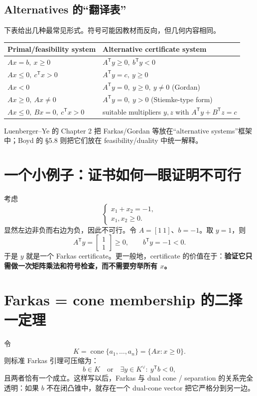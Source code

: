 \documentclass[11pt,a4paper,openany]{ctexrep}
\theoremstyle{definition}
\newcommand{\cone}{\operatorname{cone}}
\newcommand{\transpose}{\mathsf{T}}
\begin{document}
\subsection{Alternatives 的“翻译表”}
下表给出几种最常见形式。符号可能因教材而反向，但几何内容相同。
\begin{center}
\small
\begin{tabularx}{\textwidth}{>{\raggedright\arraybackslash}X >{\raggedright\arraybackslash}X}
\toprule
\textbf{Primal/feasibility system} & \textbf{Alternative certificate system}\\
\midrule
$Ax=b,\ x\ge0$ & $A^\transpose y\ge0,\ b^\transpose y<0$\\
$Ax\le0,\ c^\transpose x>0$ & $A^\transpose y=c,\ y\ge0$\\
$Ax<0$ & $A^\transpose y=0,\ y\ge0,\ y\ne0$ (Gordan)\\
$Ax\ge0,\ Ax\ne0$ & $A^\transpose y=0,\ y>0$ (Stiemke-type form)\\
$Ax\le0,\ Bx=0,\ c^\transpose x>0$ & suitable multipliers $y,z$ with $A^\transpose y+B^\transpose z=c$\\
\bottomrule
\end{tabularx}
\end{center}
Luenberger--Ye 的 Chapter 2 把 Farkas/Gordan 等放在“alternative systems”框架中；Boyd 的 \S5.8 则把它们放在 feasibility/duality 中统一解释。\cite[Ch.~2]{luenberger}\cite[\S5.8]{boyd}

\section{一个小例子：证书如何一眼证明不可行}
考虑
\[
\begin{cases}
x_1+x_2=-1,\\
x_1,x_2\ge0.
\end{cases}
\]
显然左边非负而右边为负，因此不可行。令 $A=[1\ 1]$、$b=-1$。取 $y=1$，则
\[
A^\transpose y=\begin{bmatrix}1\\1\end{bmatrix}\ge0,
\qquad b^\transpose y=-1<0.
\]
于是 $y$ 就是一个 Farkas certificate。更一般地，certificate 的价值在于：\textbf{验证它只需做一次矩阵乘法和符号检查，而不需要穷举所有 $x$。}

\section{Farkas = cone membership 的二择一定理}
令
\[
K=\cone\{a_1,\ldots,a_n\}=\{Ax:x\ge0\}.
\]
则标准 Farkas 引理可压缩为：
\[
\boxed{b\in K}
\quad\text{or}\quad
\boxed{\exists y\in K^\vee:\ y^\transpose b<0},
\]
且两者恰有一个成立。这样写以后，Farkas 与 dual cone / separation 的关系完全透明：如果 $b$ 不在闭凸锥中，就存在一个 dual-cone vector 把它严格分到另一边。
\end{document}

